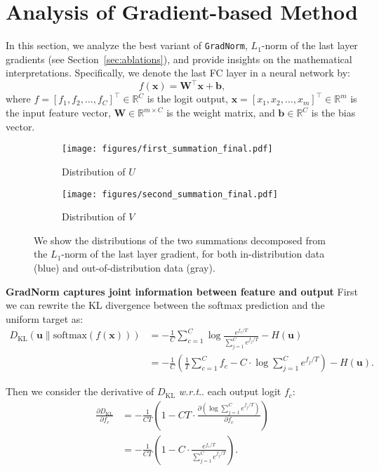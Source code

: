 \documentclass{article}
\makeatletter
\def\*#1{\mathbf{#1}}
\DeclareRobustCommand\onedot{\futurelet\@let@token\@onedot}
\def\@onedot{\ifx\@let@token.\else.\null\fi\xspace}
\def\wrt{\emph{w.r.t}\onedot} \def\dof{d.o.f\onedot}
\makeatother
\begin{document}
\section{Analysis of Gradient-based Method}
\label{sec:analysis}
In this section, we analyze the best variant of \texttt{GradNorm}, $L_1$-norm of the last layer gradients (see Section~\ref{sec:ablations}), and provide insights on the mathematical interpretations.
Specifically, we denote the last FC layer in a neural network by: 
\begin{equation}
    f(\*x) = \*W^\top\*x + \mathbf{b},
\end{equation}
where $f = [f_1, f_2, \dots, f_C]^\top \in \mathbb{R}^C$ is the logit output, $\mathbf{x} = [x_1, x_2, \dots, x_m]^\top \in \mathbb{R}^m$ is the input feature vector, $\mathbf{W} \in \mathbb{R}^{m \times C}$ is the weight matrix, and $\mathbf{b} \in \mathbb{R}^C$ is the bias vector.




\begin{figure*}[t]
    \centering
    \begin{subfigure}{1\textwidth}
    \texttt{[image: figures/first\_summation\_final.pdf]}
    \caption{Distribution of  $U$}
    \end{subfigure}
\begin{subfigure}{1\textwidth}
    \texttt{[image: figures/second\_summation\_final.pdf]}
    \caption{Distribution of $V$}
    \end{subfigure}
    \caption{\small{We show the distributions of the two summations decomposed from the $L_1$-norm of the last layer gradient, for both in-distribution data (blue) and out-of-distribution data (gray). }}
    \label{fig:first_and_second_sum}
\end{figure*}

\textbf{{GradNorm} captures joint information between feature and output} First we can rewrite the KL divergence between the softmax prediction and the uniform target as:
\begin{align*}
        D_\text{KL} (\*u \lVert \text{softmax}(f(\*x))) & = - \frac{1}{C}\sum_{c=1}^C \log{ \frac{e^{{f_c} / T}}{\sum_{j=1}^C e^{{f_{j}} / T}}} - H(\*u)  \\&= - \frac{1}{C} \left( \frac{1}{T}\sum_{c=1}^C f_c - C \cdot \log{{\sum_{j=1}^C e^{{f_{j}} / T}}} \right) - H(\*u).
\end{align*}

Then we consider the derivative of $D_\text{KL}$ \wrt each output logit $f_c$:
\begin{align*}
        \frac{\partial D_\text{KL}}{\partial f_c}
       & = -\frac{1}{CT} \left( 1 - CT \cdot \frac{\partial \left( \log{{\sum_{j=1}^C e^{{f_{j}} / T}}}\right)}{\partial f_c} \right) \\
    &    = -\frac{1}{CT} \left( 1 - C \cdot \frac{e^{f_c / T}}{\sum_{j=1}^C e^{{f_{j}} / T}} \right).
\end{align*}
\end{document}
